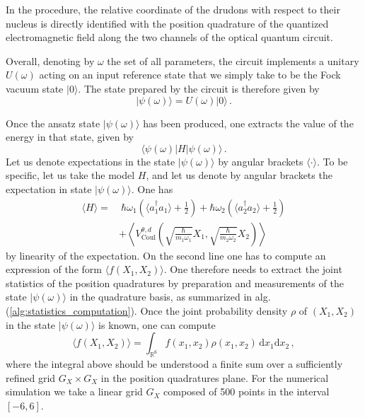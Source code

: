 \documentclass[reprint, amsmath, amssymb, aps, pra]{revtex4-2}
\begin{document}
    In the procedure, the relative coordinate of the drudons with respect to their nucleus is directly identified with the position quadrature of the quantized electromagnetic field along the two channels of the optical quantum circuit.

    Overall, denoting by $\omega$ the set of all parameters, the circuit implements a unitary $U(\omega)$ acting on an input reference state that we simply take to be the Fock vacuum state $|0\rangle$. The state prepared by the circuit is therefore given by
    \begin{equation}
        |\psi(\omega)\rangle = U(\omega)|0\rangle\,.
    \end{equation}

    Once the ansatz state $|\psi(\omega)\rangle$ has been produced, one extracts the value of the energy in that state, given by
    \begin{equation}
        \langle\psi(\omega)|H|\psi(\omega)\rangle\,.
    \end{equation}
    Let us denote expectations in the state $|\psi(\omega)\rangle$ by angular brackets $\langle\cdot\rangle$.
    To be specific, let us take the model $H$, and let us denote by angular brackets the expectation in state $|\psi(\omega)\rangle$. One has
    \begin{equation}
    \label{eq:loss}
    \begin{split}
        \langle H\rangle =&\ \hbar\omega_1\left(\langle a_{1}^\dagger a_{1}\rangle+\frac{1}{2}\right)+\hbar\omega_2\left(\langle a_{2}^\dagger a_{2}\rangle+\frac{1}{2}\right)\\
        &+ \left\langle V_\text{Coul}^{\theta, d}\left(\sqrt{\frac{\hbar}{m_1\omega_1}} X_1, \sqrt{\frac{\hbar}{m_2\omega_2}} X_2\right)\right\rangle
    \end{split}
    \end{equation}
    by linearity of the expectation. On the second line one has to compute an expression of the form $\langle f(X_1, X_2)\rangle$. One therefore needs to extract the joint statistics of the position quadratures by preparation and measurements of the state $|\psi(\omega)\rangle$ in the quadrature basis, as summarized in alg. (\ref{alg:statistics_computation}). Once the joint probability density $\rho$ of $(X_1, X_2)$ in the state $|\psi(\omega)\rangle$ is known, one can compute
    \begin{equation}
        \langle f(X_1, X_2)\rangle = \int_{\mathbb R^{6}}f(x_1, x_2)\rho(x_1, x_2)\,\text{d}x_1\text{d}x_2\,,
    \end{equation}
    where the integral above should be understood a finite sum over a sufficiently refined grid $G_X\times G_X$ in the position quadratures plane. For the numerical simulation we take a linear grid $G_X$ composed of 500 points in the interval $[-6,6]$.
\end{document}
